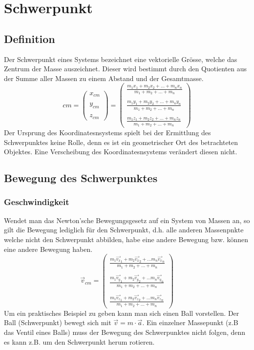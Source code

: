 \chapter{Schwerpunkt}

\section{Definition}
Der Schwerpunkt eines Systems bezeichnet eine vektorielle Grösse,
welche das Zentrum der Masse auszeichnet. Dieser wird bestimmt
durch den Quotienten aus der Summe aller Massen zu einem Abstand
und der Gesamtmasse.
\[ \boxed{ cm =  
	\begin{pmatrix} 
		x_{cm} \\ 
		\\
		y_{cm} \\
		\\
		z_{cm}
	\end{pmatrix} 
	=
	\begin{pmatrix}
		\frac{m_1 x_1 + m_2 x_2 + \dots + m_n x_n}
			{m_1 + m_2 + \dots + m_n} \\
		\\
		\frac{m_1 y_1 + m_2 y_2 + \dots + m_n y_n}
			{m_1 + m_2 + \dots + m_n} \\
		\\
		\frac{m_1 z_1 + m_2 z_2 + \dots + m_n z_n}
			{m_1 + m_2 + \dots + m_n}
	\end{pmatrix} }
\]
Der Ursprung des Koordinatesnsystems spielt bei der Ermittlung des
Schwerpunktes keine Rolle, denn es ist ein geometrischer Ort des 
betrachteten Objektes. Eine Verscheibung des Koordinatesnsystems
verändert diesen nicht.

\section{Bewegung des Schwerpunktes}

\subsection{Geschwindigkeit}
Wendet man das Newton'sche Bewegungsgesetz auf ein System von
Massen an, so gilt die Bewegung lediglich für den Schwerpunkt,
d.h. alle anderen Massenpnkte welche nicht den Schwerpunkt abbilden,
habe eine andere Bewegung bzw. können eine andere Bewegung haben.
\[ \boxed{ \vec{v}_{cm} = 
	\begin{pmatrix} 
		\frac{m_1 \vec{v_x}_1 
			+ m_2 \vec{v_x}_2 
			+ \dots m_n \vec{v_x}_n}
			{m_1 + m_2 + \dots + m_n} \\
		\\
		\frac{m_1 \vec{v_y}_1 
			+ m_2 \vec{v_y}_2 
			+ \dots m_n \vec{v_y}_n}
			{m_1 + m_2 + \dots + m_n} \\
		\\
		\frac{m_1 \vec{v_z}_1 
			+ m_2 \vec{v_z}_2 
			+ \dots m_n \vec{v_z}_n}
			{m_1 + m_2 + \dots + m_n}
	\end{pmatrix} }
\]
Um ein praktisches Beispiel zu geben kann man sich einen Ball vorstellen.
Der Ball (Schwerpunkt) bewegt sich mit $\vec{v} = m \cdot \vec{a}$.
Ein einzelner Massepunkt (z.B das Ventil eines Balls) muss der Bewegung
des Schwerpunktes nicht folgen, denn es kann z.B. um den Schwerpunkt 
herum rotieren.

